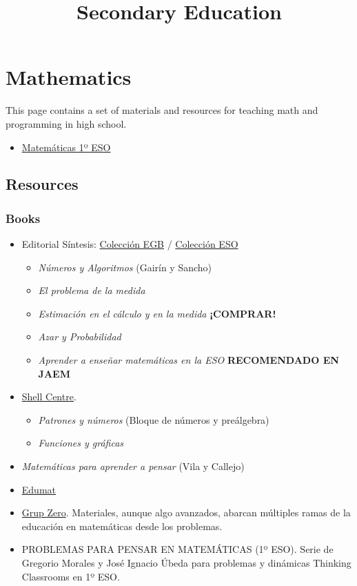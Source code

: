 \title{Secondary Education}

\section*{Mathematics}

This page contains a set of materials and resources for teaching math and programming in high school.
\begin{itemize}
  \item \href{/teaching/math-1eso/}{Matemáticas 1º ESO}
\end{itemize}

\subsection*{Resources}

\subsubsection*{Books}

\begin{itemize}
  \item Editorial Síntesis: \href{https://www.sintesis.com/matem%C3%A1ticas%3A$20cultura%20y%20aprendizaje-72}{Colección EGB} / \href{https://www.sintesis.com/educación%20matemática%20en%20secundaria-70/}{Colección ESO}
  \begin{itemize}
    \item \emph{Números y Algoritmos} (Gairín y Sancho)
    \item \emph{El problema de la medida}
    \item \emph{Estimación en el cálculo y en la medida} \textbf{¡COMPRAR!}
    \item \emph{Azar y Probabilidad}
    \item \emph{Aprender a enseñar matemáticas en la ESO} \textbf{RECOMENDADO EN JAEM}
  \end{itemize}
  \item \href{https://www.mathshell.com/}{Shell Centre}.
  \begin{itemize}
    \item \emph{Patrones y números} (Bloque de números y preálgebra)
    \item \emph{Funciones y gráficas}
  \end{itemize}
  \item \emph{Matemáticas para aprender a pensar} (Vila y Callejo)
  \item \href{http://www.ugr.es/~jgodino/edumat-maestros}{Edumat}
  \item \href{https://www.grupzero.cat/}{Grup Zero}. Materiales, aunque algo avanzados, abarcan múltiples ramas de la educación en matemáticas desde los problemas.
  \item PROBLEMAS PARA PENSAR EN MATEMÁTICAS (1º ESO). Serie de Gregorio Morales y José Ignacio Úbeda para problemas y dinámicas Thinking Classrooms en 1º ESO.
\end{itemize}


